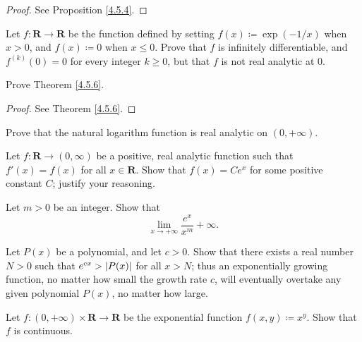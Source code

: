 \begin{proof}
    See Proposition \ref{4.5.4}.
\end{proof}

\begin{exercise}\label{ex 4.5.4}
    Let \(f : \mathbf{R} \to \mathbf{R}\) be the function defined by setting \(f(x) \coloneqq \exp(-1 / x)\) when \(x > 0\), and \(f(x) \coloneqq 0\) when \(x \leq 0\).
    Prove that \(f\) is infinitely differentiable, and \(f^{(k)}(0) = 0\) for every integer \(k \geq 0\), but that \(f\) is not real analytic at \(0\).
\end{exercise}

\begin{exercise}\label{ex 4.5.5}
    Prove Theorem \ref{4.5.6}.
\end{exercise}

\begin{proof}
    See Theorem \ref{4.5.6}.
\end{proof}

\begin{exercise}\label{ex 4.5.6}
    Prove that the natural logarithm function is real analytic on \((0, +\infty)\).
\end{exercise}

\begin{exercise}\label{ex 4.5.7}
    Let \(f : \mathbf{R} \to (0, \infty)\) be a positive, real analytic function such that \(f'(x) = f(x)\) for all \(x \in \mathbf{R}\).
    Show that \(f(x) = C e^x\) for some positive constant \(C\);
    justify your reasoning.
\end{exercise}

\begin{exercise}\label{ex 4.5.8}
    Let \(m > 0\) be an integer.
    Show that
    \[
        \lim_{x \to +\infty} \frac{e^x}{x^m} +\infty.
    \]
\end{exercise}

\begin{exercise}\label{ex 4.5.9}
    Let \(P(x)\) be a polynomial, and let \(c > 0\).
    Show that there exists a real number \(N > 0\) such that \(e^{cx} > \abs*{P(x)}\) for all \(x > N\);
    thus an exponentially growing function, no matter how small the growth rate \(c\), will eventually overtake any given polynomial \(P(x)\), no matter how large.
\end{exercise}

\begin{exercise}\label{ex 4.5.10}
    Let \(f : (0, +\infty) \times \mathbf{R} \to \mathbf{R}\) be the exponential function \(f(x, y) \coloneqq x^y\).
    Show that \(f\) is continuous.
\end{exercise}